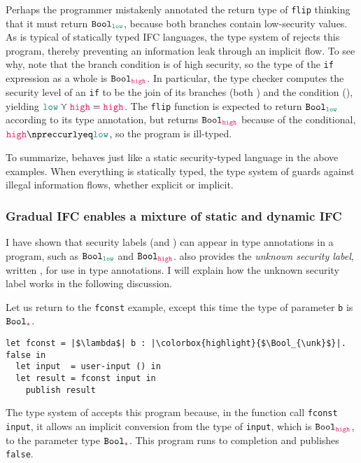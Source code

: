 \noindent Perhaps the programmer mistakenly annotated the return type of
\texttt{flip} thinking that it must return $\Bool_{\low}$, because both branches
contain low-security values. As is typical of statically typed IFC languages,
the type system of \Surface rejects this program, thereby preventing an
information leak through an implicit flow. To see why, note that the branch
condition is of high security, so the type of the \texttt{if} expression as a
whole is $\Bool_{\high}$. In particular, the type checker computes the security
level of an \texttt{if} to be the join of its branches (both \low) and the
condition (\high), yielding $\low \curlyvee \high = \high$. The \texttt{flip}
function is expected to return $\Bool_{\low}$ according to its type annotation,
but returns $\Bool_{\high}$ because of the conditional, $\high \npreccurlyeq
\low$, so the program is ill-typed.

To summarize, \Surface behaves just like a static security-typed language in the
above examples. When everything is statically typed, the type system of \Surface
guards against illegal information flows, whether explicit or implicit.

\subsubsection{Gradual IFC enables a mixture of static and dynamic IFC}

I have shown that security labels (\low and \high) can appear in type
annotations in a program, such as $\Bool_{\low}$ and $\Bool_{\high}$. \Surface
also provides the \textit{unknown security label}, written \unk, for use in type
annotations. I will explain how the unknown security label works in the
following discussion.

Let us return to the \texttt{fconst} example, except this time the type of
parameter \texttt{b} is $\Bool_{\unk}$.

\begin{lstlisting}[style=tt]
  let fconst = |$\lambda$| b : |\colorbox{highlight}{$\Bool_{\unk}$}|. false in
  let input  = user-input () in
  let result = fconst input in
    publish result
\end{lstlisting}

\noindent The type system of \Surface accepts this program because, in
the function call \texttt{fconst input}, it allows an implicit conversion from
the type of \texttt{input}, which is $\Bool_{\high}$, to the parameter
type $\Bool_{\unk}$. This program runs to completion and publishes
\texttt{false}.


